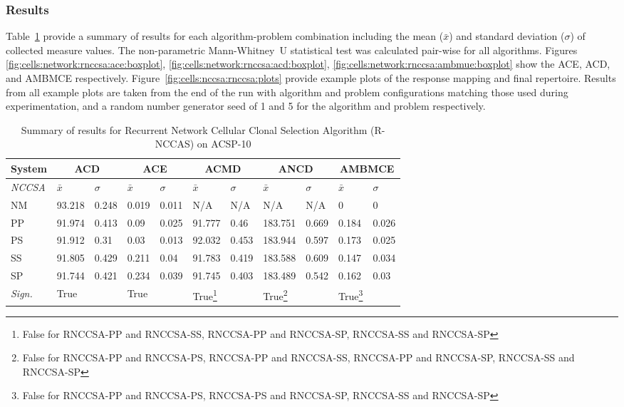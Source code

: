 %
%
\subsubsection{Results}
Table~\ref{tab:network:nccsa:rnccsa:results} provide a summary of results for each algorithm-problem combination including the mean ($\bar{x}$) and standard deviation ($\sigma$) of collected measure values. The non-parametric Mann-Whitney~U statistical test was calculated pair-wise for all algorithms. 
Figures \ref{fig:cells:network:rnccsa:ace:boxplot}, \ref{fig:cells:network:rnccsa:acd:boxplot}, \ref{fig:cells:network:rnccsa:ambmue:boxplot} show the ACE, ACD, and AMBMCE respectively. 
Figure~\ref{fig:cells:nccsa:rnccsa:plots} provide example plots of the response mapping and final repertoire. Results from all example plots are taken from the end of the run with algorithm and problem configurations matching those used during experimentation, and a random number generator seed of 1 and 5 for the algorithm and problem respectively.

\begin{table}[htp]
	\centering\small
		\begin{minipage}{\textwidth}
		\begin{tabular}{lllllllllll}
		\toprule
		\textbf{System} & \multicolumn{2}{c}{\textbf{ACD}} & \multicolumn{2}{c}{\textbf{ACE}} & \multicolumn{2}{c}{\textbf{ACMD}} & \multicolumn{2}{c}{\textbf{ANCD}} & \multicolumn{2}{c}{\textbf{AMBMCE}}\\
		\midrule
		\emph{NCCSA} & $\bar{x}$ & $\sigma$ & $\bar{x}$ & $\sigma$ & $\bar{x}$ & $\sigma$ & $\bar{x}$ & $\sigma$ & $\bar{x}$ & $\sigma$\\
		\toprule
		NM & 93.218 & 0.248 & 0.019 & 0.011 & N/A & N/A & N/A & N/A & 0 & 0 \\
		PP & 91.974 & 0.413 & 0.09 & 0.025 & 91.777 & 0.46 & 183.751 & 0.669 & 0.184 & 0.026 \\
		PS & 91.912 & 0.31 & 0.03 & 0.013 & 92.032 & 0.453 & 183.944 & 0.597 & 0.173 & 0.025 \\
		SS & 91.805 & 0.429 & 0.211 & 0.04 & 91.783 & 0.419 & 183.588 & 0.609 & 0.147 & 0.034 \\
		SP & 91.744 & 0.421 & 0.234 & 0.039 & 91.745 & 0.403 & 183.489 & 0.542 & 0.162 & 0.03 \\
		\emph{Sign.} & True &  & True &  & True\footnote{False for RNCCSA-PP and RNCCSA-SS, RNCCSA-PP and RNCCSA-SP, RNCCSA-SS and RNCCSA-SP} &  & True\footnote{False for RNCCSA-PP and RNCCSA-PS, RNCCSA-PP and RNCCSA-SS, RNCCSA-PP and RNCCSA-SP, RNCCSA-SS and RNCCSA-SP} &  & True\footnote{False for RNCCSA-PP and RNCCSA-PS, RNCCSA-PS and RNCCSA-SP, RNCCSA-SS and RNCCSA-SP} & \\
		\bottomrule
		\end{tabular}	
		\end{minipage}
	\caption{Summary of results for Recurrent Network Cellular Clonal Selection Algorithm (R-NCCAS) on ACSP-10}
	\label{tab:network:nccsa:rnccsa:results}
\end{table}

